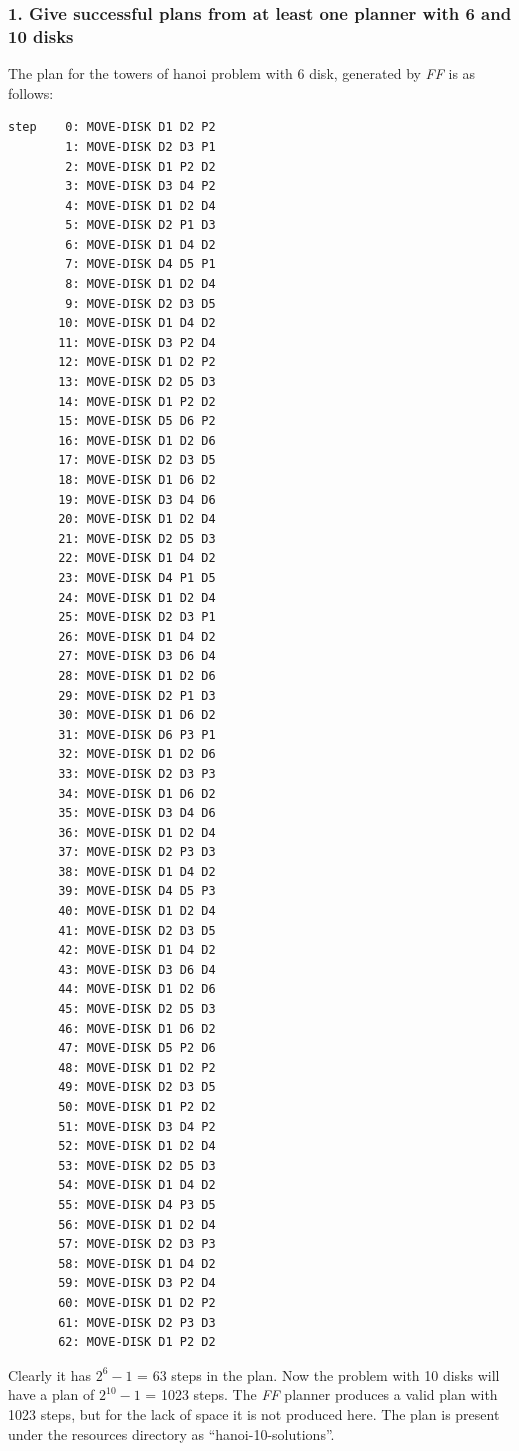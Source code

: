 \documentclass[10pt, letter]{article}
\begin{document}
\subsubsection*{1. Give successful plans from at least one planner with 6 and 10 disks}
The plan for the towers of hanoi problem with 6 disk, generated by \textit{FF} is as follows:\\
\begin{verbatim}
step    0: MOVE-DISK D1 D2 P2
        1: MOVE-DISK D2 D3 P1
        2: MOVE-DISK D1 P2 D2
        3: MOVE-DISK D3 D4 P2
        4: MOVE-DISK D1 D2 D4
        5: MOVE-DISK D2 P1 D3
        6: MOVE-DISK D1 D4 D2
        7: MOVE-DISK D4 D5 P1
        8: MOVE-DISK D1 D2 D4
        9: MOVE-DISK D2 D3 D5
       10: MOVE-DISK D1 D4 D2
       11: MOVE-DISK D3 P2 D4
       12: MOVE-DISK D1 D2 P2
       13: MOVE-DISK D2 D5 D3
       14: MOVE-DISK D1 P2 D2
       15: MOVE-DISK D5 D6 P2
       16: MOVE-DISK D1 D2 D6
       17: MOVE-DISK D2 D3 D5
       18: MOVE-DISK D1 D6 D2
       19: MOVE-DISK D3 D4 D6
       20: MOVE-DISK D1 D2 D4
       21: MOVE-DISK D2 D5 D3
       22: MOVE-DISK D1 D4 D2
       23: MOVE-DISK D4 P1 D5
       24: MOVE-DISK D1 D2 D4
       25: MOVE-DISK D2 D3 P1
       26: MOVE-DISK D1 D4 D2
       27: MOVE-DISK D3 D6 D4
       28: MOVE-DISK D1 D2 D6
       29: MOVE-DISK D2 P1 D3
       30: MOVE-DISK D1 D6 D2
       31: MOVE-DISK D6 P3 P1
       32: MOVE-DISK D1 D2 D6
       33: MOVE-DISK D2 D3 P3
       34: MOVE-DISK D1 D6 D2
       35: MOVE-DISK D3 D4 D6
       36: MOVE-DISK D1 D2 D4
       37: MOVE-DISK D2 P3 D3
       38: MOVE-DISK D1 D4 D2
       39: MOVE-DISK D4 D5 P3
       40: MOVE-DISK D1 D2 D4
       41: MOVE-DISK D2 D3 D5
       42: MOVE-DISK D1 D4 D2
       43: MOVE-DISK D3 D6 D4
       44: MOVE-DISK D1 D2 D6
       45: MOVE-DISK D2 D5 D3
       46: MOVE-DISK D1 D6 D2
       47: MOVE-DISK D5 P2 D6
       48: MOVE-DISK D1 D2 P2
       49: MOVE-DISK D2 D3 D5
       50: MOVE-DISK D1 P2 D2
       51: MOVE-DISK D3 D4 P2
       52: MOVE-DISK D1 D2 D4
       53: MOVE-DISK D2 D5 D3
       54: MOVE-DISK D1 D4 D2
       55: MOVE-DISK D4 P3 D5
       56: MOVE-DISK D1 D2 D4
       57: MOVE-DISK D2 D3 P3
       58: MOVE-DISK D1 D4 D2
       59: MOVE-DISK D3 P2 D4
       60: MOVE-DISK D1 D2 P2
       61: MOVE-DISK D2 P3 D3
       62: MOVE-DISK D1 P2 D2
\end{verbatim}
Clearly it has $2^6 - 1$ = 63 steps in the plan. Now the problem with 10 disks will have a plan of $2^10 - 1$ = 1023 steps. The \textit{FF} planner produces a valid plan with 1023 steps, but for the lack of space it is not produced here. The plan is present under the resources directory as ``hanoi-10-solutions''.
\end{document}
